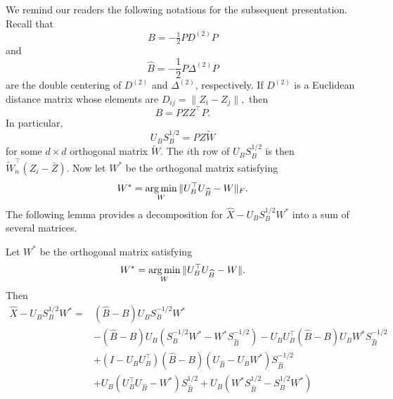 We remind our readers the following notations for the subsequent presentation. 
 Recall that 
 $$B = -\tfrac{1}{2} P D^{(2)} P$$ 
 and $$\hat{B} = -\frac{1}{2} P \Delta^{(2)} P$$
  are the double centering of $D^{(2)}$ and $\Delta^{(2)}$, respectively. If $D^{(2)}$ 
is a Euclidean distance matrix whose elements are $D_{ij} = \|Z_i -Z_j\|,$ then $$B = P Z Z^{\top} P.$$ In particular, $$U_B S_B^{1/2} = P Z \tilde{W}$$ for some $d \times d$ orthogonal matrix $\tilde{W}$. The $i$th row of $U_B S_B^{1/2}$ is then $\tilde{W}_n^{\top} (Z_i - \bar{Z}).$ Now let $W^{*}$ be the orthogonal matrix satisfying $$W^{*} = \operatorname*{arg\,min}_{W} \|U_B^{\top} U_{\widehat{B}} - W\|_{F}.$$ 
The following lemma provides a decomposition for $\hat{X} - U_B S_B^{1/2} W^*$ into a sum of several matrices. 
\begin{lemma}
\label{appthm2}
  Let $W^{*}$ be the orthogonal matrix satisfying $$W^{*} = \operatorname*{arg\,min}_{W} \|U_B^{\top} U_{\widehat{B}} - W\|.$$ Then 
      \begin{align}
          \hat{X} - U_B S_B^{1/2} W^*  =&   ( \hat{B} - B) U_B S_B^{-1/2} W^{*}  \label{term1}\\
          & - (\hat{B} - B) U_B (S_{B}^{-1/2} W^{*} - W^{*} S_{\hat{B}}^{-1/2})  - U_B U_B^{\top} (\hat{B} - B) U_B W^* S_{\hat{B}}^{-1/2}      \label{term3}\\
          & + (I - U_B U_B^{\top}) (\hat{B} - B) (U_{\hat{B}} - U_B W^{*}) S_{\hat{B}}^{-1/2}     \label{term4}\\
          & + U_B (U_B^{\top} U_{\hat{B}} - W^*) S_{\hat{B}}^{1/2} + U_B (W^{*} S_{\hat{B}}^{1/2} - S_B^{1/2} W^{*})     \label{term6}
    \end{align}
\end{lemma}
